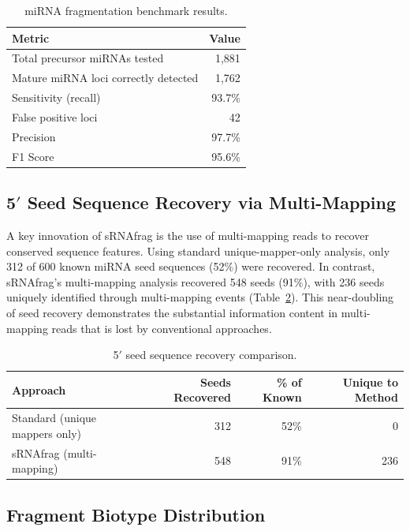 \documentclass[11pt]{article}
\begin{document}
\begin{table}[ht]
\centering
\caption{miRNA fragmentation benchmark results.}
\label{tab:mirna_benchmark}
\begin{tabular}{lr}
\toprule
\textbf{Metric} & \textbf{Value} \\
\midrule
Total precursor miRNAs tested & 1,881 \\
Mature miRNA loci correctly detected & 1,762 \\
Sensitivity (recall) & 93.7\% \\
False positive loci & 42 \\
Precision & 97.7\% \\
F1 Score & 95.6\% \\
\bottomrule
\end{tabular}
\end{table}

\subsection{5$'$ Seed Sequence Recovery via Multi-Mapping}

A key innovation of sRNAfrag is the use of multi-mapping reads to recover conserved sequence features. Using standard unique-mapper-only analysis, only 312 of 600 known miRNA seed sequences (52\%) were recovered. In contrast, sRNAfrag's multi-mapping analysis recovered 548 seeds (91\%), with 236 seeds uniquely identified through multi-mapping events (Table~\ref{tab:seed_recovery}). This near-doubling of seed recovery demonstrates the substantial information content in multi-mapping reads that is lost by conventional approaches.

\begin{table}[ht]
\centering
\caption{5$'$ seed sequence recovery comparison.}
\label{tab:seed_recovery}
\begin{tabular}{lrrr}
\toprule
\textbf{Approach} & \textbf{Seeds Recovered} & \textbf{\% of Known} & \textbf{Unique to Method} \\
\midrule
Standard (unique mappers only) & 312 & 52\% & 0 \\
sRNAfrag (multi-mapping) & 548 & 91\% & 236 \\
\bottomrule
\end{tabular}
\end{table}

\subsection{Fragment Biotype Distribution}
\end{document}
